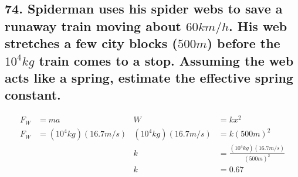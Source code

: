 \documentclass[12pt,a4paper,english]{article}
\begin{document}
\begin{flushleft}
  \subsection{74. Spiderman uses his spider webs to save a runaway train moving about $60km/h$. His web stretches a few city blocks ($500 m$) before the $10^4kg$ train comes to a stop. Assuming the web acts like a spring, estimate the effective spring constant.}
  \begin{align*}
    F_W&=ma
       &
    W&=kx^2
    \\
    F_W&=(10^4kg)(16.7m/s)
       &
    (10^4kg)(16.7m/s)&=k(500m)^2
    \\
                     &&k&=\frac{(10^4kg)(16.7m/s)}{(500m)^2}
                     \\
                     &&k&=0.67
  \end{align*}
\end{flushleft}
\end{document}
